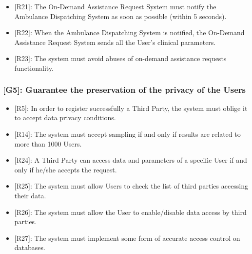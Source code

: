 \documentclass[12pt,a4paper]{article}
\begin{document}
\begin{itemize}
\begin{itemize}
				\\ \\
				\item {[R21]}: The On-Demand Assistance Request System must notify the Ambulance Dispatching System as soon as possible (within 5 seconds).
				\item {[R22]}: When the Ambulance Dispatching System is notified, the On-Demand Assistance Request System sends all the User's clinical parameters.
				\item {[R23]}: The system must avoid abuses of on-demand assistance requests functionality.
			\end{itemize}
		\end{itemize}
	
	\subsubsection*{{[}{G5}{]}: Guarantee the preservation of the privacy of the Users}
	\begin{itemize}
		\begin{itemize}
			\item {[R5]}: In order to register successfully a Third Party, the system must oblige it to accept data privacy conditions.
			\item {[R14]}: The system must accept sampling if and only if results are related to more than 1000 Users.
			\item {[R24]}: A Third Party can access data and parameters of a specific User if and only if he/she accepts the request.
			\item {[R25]}: The system must allow Users to check the list of third parties accessing their data.
			\item {[R26]}: The system must allow the User to enable/disable data access by third parties.
			\item {[R27]}: The system must implement some form of accurate access control on databases.
		\end{itemize}
	\end{itemize}
\end{document}
